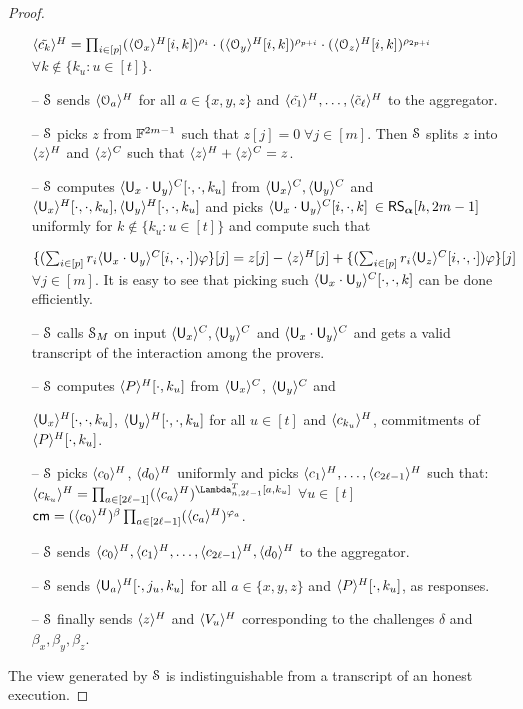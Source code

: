 \begin{proof}
\begin{itemize}
		$\langle{\tilde{c_k}}\rangle^H = \prod_{i\in[p]} (\langle{\mathcal{O}_x}\rangle^H[i,k])^{\rho_i}\cdot(\langle{\mathcal{O}_y}\rangle^H[i,k])^{\rho_{p+i}}\cdot(\langle{\mathcal{O}_z}\rangle^H[i,k])^{\rho_{2p+i}}$ $\forall k\notin\{k_u:u\in[t]\}$.
		\item[--] $\mathcal{S}$ sends $\langle{\mathcal{O}_a}\rangle^H$ for all $a\in\{x,y,z\}$ and $\langle{\tilde{c_1}}\rangle^H, \ldots, \langle{\tilde{c}_{\ell}}\rangle^H$ to the aggregator.
		\item[--] $\mathcal{S}$ picks $z$ from $\mathbb{F}^{2m-1}$ such that $z[j]=0\; \forall j\in[m]$. Then $\mathcal{S}$ splits $z$ into $\langle{z}\rangle^H$ and $\langle{z}\rangle^C$ such that $\langle{z}\rangle^H+\langle{z}\rangle^C = z$.
		\item[--] $\mathcal{S}$ computes $\langle{\mathsf{U}_x\cdot\mathsf{U}_y}\rangle^C[\cdot,\cdot,k_u]$ from $\langle{\mathsf{U}_x}\rangle^C, \langle{\mathsf{U}_y}\rangle^C$ and $\langle{\mathsf{U}_x}\rangle^H[\cdot,\cdot,k_u], \langle{\mathsf{U}_y}\rangle^H[\cdot,\cdot,k_u]$ and picks $\langle{\mathsf{U}_x\cdot\mathsf{U}_y}\rangle^C[i,\cdot,k]$ $\in \mathsf{RS}_{\bm{\alpha}}[h,2m-1]$ uniformly for $k\notin \{k_u:u\in[t]\}$ and compute such that
		
		$\{(\sum_{i\in[p]}r_i\langle{\mathsf{U}_x\cdot\mathsf{U}_y}\rangle^C[i,\cdot,\cdot])\varphi\}[j]=z[j] -\langle{z}\rangle^H[j]+\{(\sum_{i\in[p]}r_i\langle{\mathsf{U}_z}\rangle^C[i,\cdot,\cdot])\varphi\}[j]$ $\forall j\in[m]$.
		It is easy to see that picking such $\langle{\mathsf{U}_x\cdot\mathsf{U}_y}\rangle^C[\cdot,\cdot,k]$ can be done efficiently.
		\item[--] $\mathcal{S}$ calls $\mathcal{S}_{M}$ on input $\langle{\mathsf{U}_x}\rangle^C, \langle{\mathsf{U}_y}\rangle^C$ and $\langle{\mathsf{U}_x\cdot\mathsf{U}_y}\rangle^C$ and gets a valid transcript of the interaction among the provers.
		\item[--] $\mathcal{S}$ computes $\langle{P}\rangle^H[\cdot,k_u]$ from $\langle{\mathsf{U}_x}\rangle^C$, $\langle{\mathsf{U}_y}\rangle^C$ and 
		
		\noindent$\langle{\mathsf{U}_x}\rangle^H[\cdot,\cdot,k_u]$, $\langle{\mathsf{U}_y}\rangle^H[\cdot,\cdot,k_u]$ for all $u\in[t]$ and $\langle{c_{k_u}}\rangle^H$, commitments of $\langle{P}\rangle^H[\cdot,k_u]$.
		
		\item[--] $\mathcal{S}$ picks $\langle{c_0}\rangle^H$, $\langle{d_0}\rangle^H$ uniformly and picks
		$\langle{c_1}\rangle^H, \ldots, \langle{c_{2\ell-1}}\rangle^H$ such that:\\
		$\honshr{c_{k_u}} = \prod_{a\in[2\ell-1]}(\honshr{c_a})^{\Lambda_{n,2\ell-1}^T[a,k_u]}$ $\forall u\in[t]$\\
		$\mathsf{cm} = (\langle{c_0}\rangle^H)^{\beta}\prod_{a\in[2\ell-1]}(\langle{c_a}\rangle^H)^{\varphi_a}$.
		\item[--] $\mathcal{S}$ sends $\langle{c_0}\rangle^H, \langle{c_1}\rangle^H, \ldots, \langle{c_{2\ell-1}}\rangle^H, \langle{d_0}\rangle^H$ to the aggregator.
		\item[--] $\mathcal{S}$ sends $\langle{\mathsf{U}_a}\rangle^H[\cdot,j_u,k_u]$ for all $a\in\{x,y,z\}$ and $\langle{P}\rangle^H[\cdot,k_u]$, as responses.
		\item[--] $\mathcal{S}$ finally sends $\langle{z}\rangle^H$ and $\langle{V_u}\rangle^H$ corresponding to the challenges $\delta$ and $\beta_x, \beta_y, \beta_z$.
	\end{itemize}
	The view generated by $\mathcal{S}$ is indistinguishable from a transcript of an honest execution.
\end{proof}

